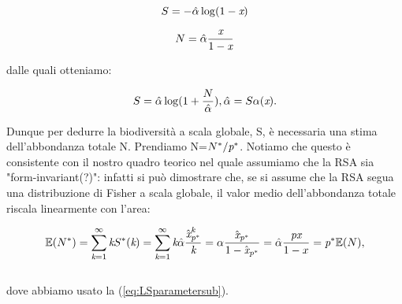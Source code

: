 \begin{equation}
S=-\hat \alpha \log(1-\emph{x})
\label{eq:SLS}
\end{equation}

\begin{equation}
N=\hat \alpha \frac{\emph{x}}{1-\emph{x}}
\label{eq:NLS}
\end{equation}

dalle quali otteniamo:

\begin{equation}
S=\hat \alpha \log(1+ \frac{N}{\hat \alpha}),  \hat \alpha=S\alpha(\emph{x}).
\label{eq:SalphaLS}
\end{equation}

Dunque per dedurre la biodiversità a scala globale, S, è necessaria una stima dell'abbondanza totale N. Prendiamo N=$N^*/ \emph{p}^*$. Notiamo che questo è consistente con il nostro quadro teorico nel quale assumiamo che la RSA sia "form-invariant(?)": infatti si può dimostrare che, se si assume che la RSA segua una distribuzione di Fisher a scala globale, il valor medio dell'abbondanza totale riscala linearmente con l'area:

\begin{equation}
\mathbb{E}(N^*)=\sum_{\emph{k}=1}^\infty \emph{k}S^*(\emph{k})=\sum_{\emph{k}=1}^\infty \emph{k} \hat \alpha  \frac{\hat {\emph{x}}^\emph{k}_{\emph{p}^*}}{\emph{k}}=\alpha \frac{\hat {\emph{x}}_{\emph{p}^*}}{1-\hat {\emph{x}}_{\emph{p}^*}}= \hat 	\alpha \frac{\emph{px}}{1-x}= \emph{p}^* \mathbb{E}(N),
\end{equation}
\\
dove abbiamo usato la  (\ref{eq:LSparametersub}).



